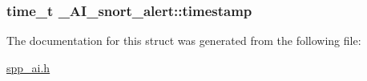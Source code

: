 \label{struct__AI__snort__alert_a1687fccc26bb211591db8b36ffec5348}
\hypertarget{struct__AI__snort__alert_a10a67f60ca3da339a2104849a0b2ac19}{
\subsubsection[{timestamp}]{\setlength{\rightskip}{0pt plus 5cm}time\_\-t {\bf \_\-AI\_\-snort\_\-alert::timestamp}}}
\label{struct__AI__snort__alert_a10a67f60ca3da339a2104849a0b2ac19}


The documentation for this struct was generated from the following file:\begin{DoxyCompactItemize}
\item 
\hyperlink{spp__ai_8h}{spp\_\-ai.h}\end{DoxyCompactItemize}
